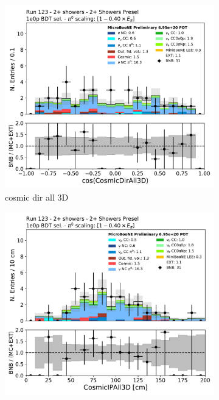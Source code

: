 \begin{figure}[H]
    \centering
    \begin{subfigure}{0.3\textwidth}
    \includegraphics[width=1.0\textwidth]{Sidebands/Figures/TwoShr_1e0pSel/BDT/CosmicDirAll3D.pdf}
    \caption{cosmic dir all 3D}
    \end{subfigure}
    \begin{subfigure}{0.3\textwidth}
    \includegraphics[width=1.0\textwidth]{Sidebands/Figures/TwoShr_1e0pSel/BDT/CosmicIPAll3D.pdf}

\end{subfigure}
\end{figure}
